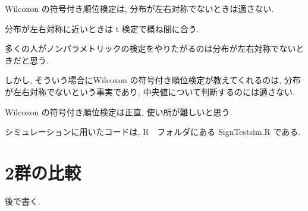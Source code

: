 \documentclass[12pt]{jsarticle}
\begin{document}
Wilcoxon の符号付き順位検定は, 分布が左右対称でないときは適さない. 

分布が左右対称に近いときは t 検定で概ね間に合う. 

多くの人がノンパラメトリックの検定をやりたがるのは分布が左右対称でないときだと思う.

しかし, そういう場合にWilcoxon の符号付き順位検定が教えてくれるのは, 分布が左右対称でないという事実であり, 中央値について判断するのには適さない.

 Wilcoxon の符号付き順位検定は正直, 使い所が難しいと思う.
 
 シミュレーションに用いたコードは, R　フォルダにある SignTestsim.R である.
 
 \section{2群の比較}
 後で書く.
\end{document}
